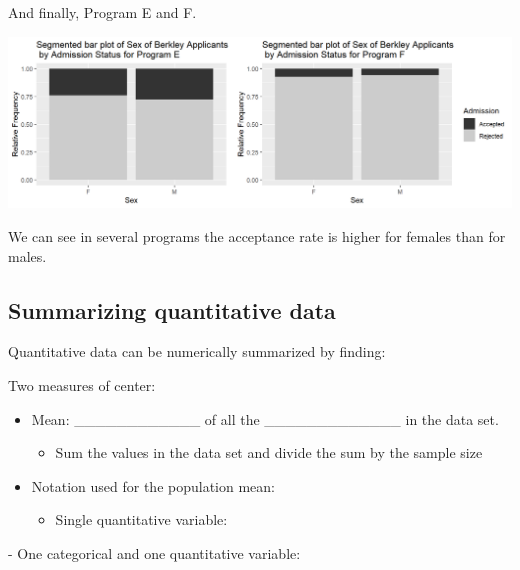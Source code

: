 \documentclass[
]{report}
\providecommand{\tightlist}{%
  \setlength{\itemsep}{0pt}\setlength{\parskip}{0pt}}
\newcommand{\rgi}{\hspace{24pt}}  %
\begin{document}
And finally, Program E and F.

\begin{center}\includegraphics[width=0.85\linewidth]{images/SimPara_EF} \end{center}

We can see in several programs the acceptance rate is higher for females than for males.

\vspace{1in}

\newpage

\hypertarget{summarizing-quantitative-data}{%
\subsection*{Summarizing quantitative data}\label{summarizing-quantitative-data}}


Quantitative data can be numerically summarized by finding:

Two measures of center:

\begin{itemize}
\item
  Mean: \_\_\_\_\_\_\_\_\_\_\_\_ of all the \_\_\_\_\_\_\_\_\_\_\_\_\_ in the data set.

  \begin{itemize}
  \tightlist
  \item
    Sum the values in the data set and divide
    the sum by the sample size
  \end{itemize}
\item
  Notation used for the population mean:

  \begin{itemize}
  \tightlist
  \item
    Single quantitative variable:
  \end{itemize}
\end{itemize}

\vspace{0.2in}

\rgi \rgi - One categorical and one quantitative variable:
\end{document}
